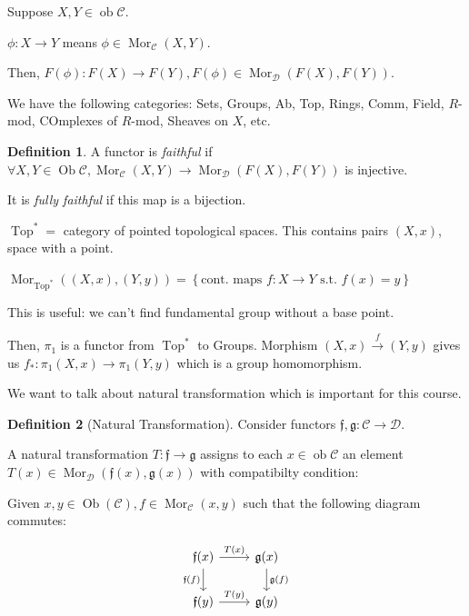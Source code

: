 \documentclass{article}
\theoremstyle{definition}
\newtheorem*{definition}{Definition}
\begin{document}
    Suppose \(X,Y\in \operatorname{ob} \mathcal{C}\).

    \(\phi: X \to Y\) means \(\phi \in \operatorname{Mor}_{\mathcal{C}}(X,Y)\).
    
    Then, \(F(\phi): F(X) \to F(Y), F(\phi)\in \operatorname{Mor}_{\mathcal{D}}(F(X),F(Y))\). 

    We have the following categories: Sets, Groups, Ab, Top, Rings, Comm, Field, \(R\)-mod, COmplexes of \(R\)-mod, Sheaves on \(X\), etc.

    \begin{definition}
        A functor is \textit{faithful} if \(\forall X,Y\in \operatorname{Ob} \mathcal{C}, \operatorname{Mor}_{\mathcal{C}} (X,Y) \to \operatorname{Mor}_{\mathcal{D}}(F(X),F(Y))\) is injective.

        It is \textit{fully faithful} if this map is a bijection.
    \end{definition}

    \(\operatorname{Top} ^{\ast} =\) category of pointed topological spaces. This contains pairs \((X,x)\), space with a point.
    
    \(\operatorname{Mor}_{\operatorname{Top}^{\ast}}\left( (X,x),(Y,y) \right) = \left\{ \text{cont. maps } f: X\to Y \text{ s.t. } f(x) = y \right\}\)

    This is useful: we can't find fundamental group without a base point.

    Then, \(\pi_1\) is a functor from \(\operatorname{Top}^{\ast}\) to Groups. Morphism \((X,x) \xrightarrow{f} (Y,y)\) gives us \(f_{\ast} : \pi_1(X,x) \to \pi_1(Y,y)\) which is a group homomorphism.

    We want to talk about natural transformation which is important for this course.

    \begin{definition}
        [Natural Transformation] Consider functors \(\mathfrak{f},\mathfrak{g}: \mathcal{C} \to \mathcal{D}\).

        A natural transformation \(T: \mathfrak{f} \to \mathfrak{g}\) assigns to each \(x \in \operatorname{ob} \mathcal{C}\) an element \(T(x) \in \operatorname{Mor}_{\mathcal{D}} (\mathfrak{f}(x), \mathfrak{g}(x))\) with compatibilty condition:

        Given \(x,y\in \operatorname{Ob} (\mathcal{C}), f\in \operatorname{Mor}_{\mathcal{C}}(x,y)\) such that the following diagram commutes:

        \[
            \begin{tikzcd}
                \mathfrak{f} (x) \ar[r,"T(x)"] \ar[d,"\mathfrak{f}(f)"'] & \mathfrak{g}(x) \ar[d,"\mathfrak{g}(f)"] \\ \mathfrak{f}(y) \ar[r,"T(y)"] & \mathfrak{g}(y) 
            \end{tikzcd}
        \]
    \end{definition}
\end{document}
